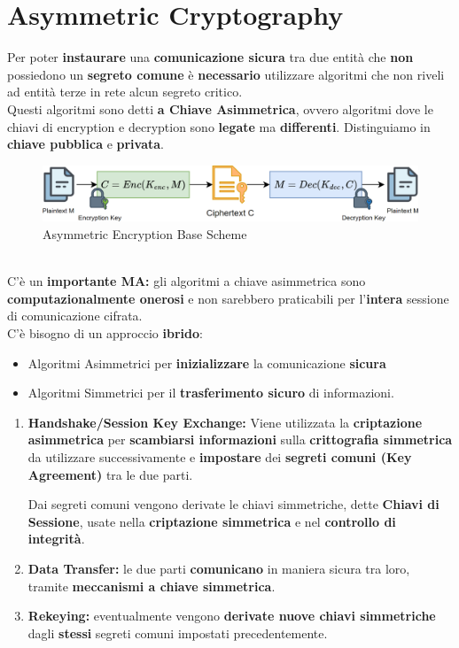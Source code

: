 \chapter{Asymmetric Cryptography}
Per poter \textbf{instaurare} una \textbf{comunicazione sicura} tra due entità che \textbf{non} possiedono un \textbf{segreto comune} è \textbf{necessario} utilizzare algoritmi che non riveli ad entità terze in rete alcun segreto critico.\\
Questi algoritmi sono detti \textbf{a Chiave Asimmetrica}, ovvero algoritmi dove le chiavi di encryption e decryption sono \textbf{legate} ma \textbf{differenti}. Distinguiamo in \textbf{chiave pubblica} e \textbf{privata}.
\begin{figure}[h]
    \centering
    \includegraphics{image/asimmcrypto.png}
    \caption{Asymmetric Encryption Base Scheme}
    \label{fig:asymmcrypto}
\end{figure}\\
C'è un \textbf{importante MA:} gli algoritmi a chiave asimmetrica sono \textbf{computazionalmente onerosi} e non sarebbero praticabili per l'\textbf{intera} sessione di comunicazione cifrata.\\
C'è bisogno di un approccio \textbf{ibrido}:
\begin{itemize}
    \item Algoritmi Asimmetrici per \textbf{inizializzare} la comunicazione \textbf{sicura}
    \item Algoritmi Simmetrici per il \textbf{trasferimento sicuro} di informazioni.
\end{itemize}
\begin{definition}
\begin{enumerate}
    \item \textbf{Handshake/Session Key Exchange:} Viene utilizzata la \textbf{criptazione asimmetrica} per \textbf{scambiarsi informazioni} sulla \textbf{crittografia simmetrica} da utilizzare successivamente e \textbf{impostare} dei \textbf{segreti comuni (Key Agreement)} tra le due parti.\\
    \begin{remark}
    Dai segreti comuni vengono derivate le chiavi simmetriche, dette \textbf{Chiavi di Sessione}, usate nella\textbf{ criptazione simmetrica} e nel \textbf{controllo di integrità}.
    \end{remark}
    \item \textbf{Data Transfer:} le due parti \textbf{comunicano} in maniera sicura tra loro, tramite \textbf{meccanismi a chiave simmetrica}.
    \item \textbf{Rekeying:} eventualmente vengono \textbf{derivate nuove chiavi simmetriche} dagli \textbf{stessi} segreti comuni impostati precedentemente.
\end{enumerate}
\end{definition}
